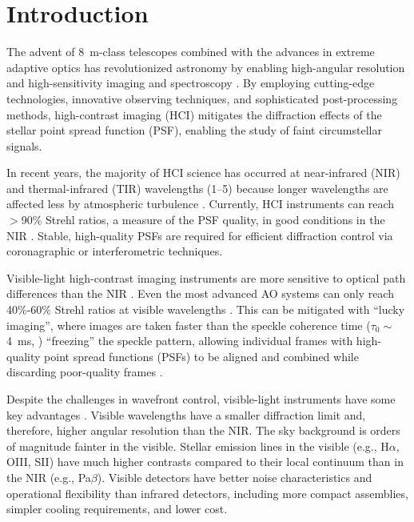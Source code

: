 \section{Introduction}\label{sec:intro}

The advent of \SI{8}{\meter}-class telescopes combined with the advances in extreme adaptive optics has revolutionized astronomy by enabling high-angular resolution and high-sensitivity imaging and spectroscopy \citep{guyon_extreme_2018,currie_direct_2023,galicher_imaging_2024}. By employing cutting-edge technologies, innovative observing techniques, and sophisticated post-processing methods, high-contrast imaging (HCI) mitigates the diffraction effects of the stellar point spread function (PSF), enabling the study of faint circumstellar signals.

In recent years, the majority of HCI science has occurred at near-infrared (NIR) and thermal-infrared (TIR) wavelengths (\SIrange{1}{5}{\micron}) because longer wavelengths are affected less by atmospheric turbulence \citep{fried_optical_1966,roddier_effects_1981}. Currently, HCI instruments can reach $>$90\% Strehl ratios, a measure of the PSF quality, in good conditions in the NIR \citep{beuzit_sphere_2019,lozi_status_2020}. Stable, high-quality PSFs are required for efficient diffraction control via coronagraphic or interferometric techniques.

Visible-light high-contrast imaging instruments are more sensitive to optical path differences than the NIR \citep{fried_optical_1966,roddier_effects_1981}. Even the most advanced AO systems can only reach 40\%-60\% Strehl ratios at visible wavelengths \citep{ahn_scexao_2021,males_magao-x_2022}. This can be mitigated with ``lucky imaging'', where images are taken faster than the speckle coherence time ($\tau_0 \sim$\SI{4}{\milli\second}, \citealp{kooten_climate_2022}) ``freezing'' the speckle pattern, allowing individual frames with high-quality point spread functions (PSFs) to be aligned and combined while discarding poor-quality frames \citep{law_lucky_2006, garrel_highly_2012, lang_tractor_2016}.

Despite the challenges in wavefront control, visible-light instruments have some key advantages \citep{close_into_2014}.  Visible wavelengths have a smaller diffraction limit and, therefore, higher angular resolution than the NIR. The sky background is orders of magnitude fainter in the visible. Stellar emission lines in the visible (e.g., H$\alpha$, OIII, SII) have much higher contrasts compared to their local continuum than in the NIR (e.g., Pa$\beta$). Visible detectors have better noise characteristics and operational flexibility than infrared detectors, including more compact assemblies, simpler cooling requirements, and lower cost.

